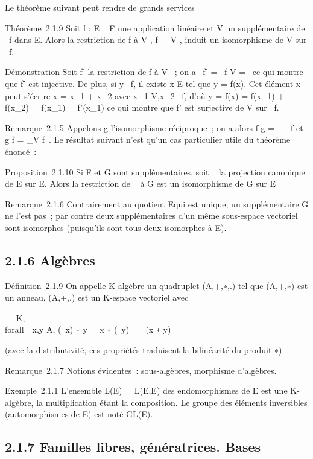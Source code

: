 Le théorème suivant peut rendre de grands services

Théorème~2.1.9 Soit f : E \rightarrow~ F une application linéaire et V un
supplémentaire de
\mathrmKer~f dans E. Alors
la restriction de f à V , f__V , induit un
isomorphisme de V sur
\mathrmIm~f.

Démonstration Soit f' la restriction de f à V ~; on a
\mathrmKer~f'
= \mathrmKer~f \bigcap V =
\0\ ce qui montre que f' est
injective. De plus, si y
\in\mathrmIm~f, il existe x \in
E tel que y = f(x). Cet élément x peut s'écrire x = x_1 +
x_2 avec x_1 \in V,x_2
\in\mathrmKer~f, d'où y = f(x)
= f(x_1) + f(x_2) = f(x_1) = f'(x_1)
ce qui montre que f' est surjective de V sur
\mathrmIm~f.

Remarque~2.1.5 Appelons g l'isomorphisme réciproque~; on a alors f \cdot g
=
\mathrmId_\mathrmIm~
f et g \cdot f = \pi_V
\parallel\mathrmKer f~. Le
résultat suivant n'est qu'un cas particulier utile du théorème énoncé~:

Proposition~2.1.10 Si F et G sont supplémentaires, soit \pi~ la projection
canonique de E sur E\diagupF. Alors la restriction de \pi~ à G est un
isomorphisme de G sur E\diagupF

Remarque~2.1.6 Contrairement au quotient E\diagupF qui est unique, un
supplémentaire G ne l'est pas~; par contre deux supplémentaires d'un
même sous-espace vectoriel sont isomorphes (puisqu'ils sont tous deux
isomorphes à E\diagupF).

\subsection{2.1.6 Algèbres}

Définition~2.1.9 On appelle K-algèbre un quadruplet (A,+,∗,.) tel que
(A,+,∗) est un anneau, (A,+,.) est un K-espace vectoriel avec

\forall~\lambda~ \in K, \\forall~~x,y \in A,
(\lambda~x) ∗ y = x ∗ (\lambda~y) = \lambda~(x ∗ y)

(avec la distributivité, ces propriétés traduisent la bilinéarité du
produit ∗).

Remarque~2.1.7 Notions évidentes~: sous-algèbres, morphisme d'algèbres.

Exemple~2.1.1 L'ensemble L(E) = L(E,E) des endomorphismes de E est une
K-algèbre, la multiplication étant la composition. Le groupe des
éléments inversibles (automorphismes de E) est noté GL(E).

\subsection{2.1.7 Familles libres, génératrices. Bases}

